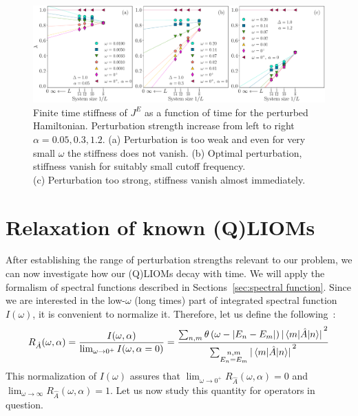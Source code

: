\begin{figure}[htbp]
  \centering
  \includegraphics[width=\textwidth]{Figures/current_decay.pdf}
  \caption{Finite time stiffness of \(J^E\) as a function of time for the perturbed Hamiltonian.
  Perturbation strength increase from left to right \(\alpha=0.05,0.3,1.2\).
  (a) Perturbation is too weak and even for very small \(\omega\) the stiffness does
  not vanish. (b) Optimal perturbation, stiffness vanish for suitably small cutoff frequency.\\
  (c) Perturbation too strong, stiffness vanish almost immediately.}
  \label{fig:current decay}
\end{figure}





\newpage

\section{Relaxation of known (Q)LIOMs}
After establishing the range of perturbation strengths relevant to our problem, we can now
investigate how our (Q)LIOMs decay with time. We will apply the formalism of spectral functions
described in Sections~\ref{sec:spectral function}.
Since we are interested in the low-\(\omega\) (long times) part of integrated spectral function
\(I(\omega)\), it is convenient to normalize it. Therefore, let us define the
following~\autocite{Mierzejewski2015Approx}:
\begin{equation}
  R_{\hat{A}}(\omega,\alpha) = \frac{I(\omega,\alpha)}{\lim_{\omega \to 0^{+}} I(\omega,\alpha=0)} = 
  \frac{\sum_{n,m}\theta\left(\omega -\abs{E_n-E_m}\right) \abs*{\matrixel{m}{\hat{A}}{n}}^2}
  {\sum_{\substack{n,m \\ E_n=E_m}} \abs*{\matrixel{m}{\hat{A}}{n}}^2}
  \label{eq:integrated spectral function}
\end{equation}
This normalization of \(I(\omega)\) assures that 
\(\lim_{\omega\to 0^{+}} R_{\hat{A}}(\omega,\alpha) = 0\) and 
\(\lim_{\omega\to \infty} R_{\hat{A}}(\omega,\alpha) = 1\). Let us now study this quantity
for operators in question.


